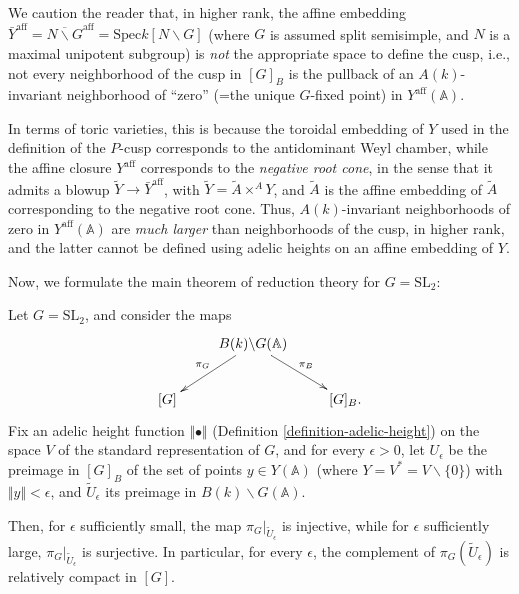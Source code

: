 \begin{remark}
 \label{remark-basic-affine}
We caution the reader that, in higher rank, the affine embedding $\bar Y^{\text{aff}}=\overline{N\backslash G}^{\text{aff}} = \text{Spec} k[N\backslash G]$ (where $G$ is assumed split semisimple, and $N$ is a maximal unipotent subgroup) is \emph{not} the appropriate space to define the cusp, i.e., not every neighborhood of the cusp in $[G]_B$ is the pullback of an $A(k)$-invariant neighborhood of ``zero'' (=the unique $G$-fixed point) in $Y^{\text{aff}}(\mathbb A)$. 

In terms of toric varieties, this is because the toroidal embedding of $Y$ used in the definition of the $P$-cusp corresponds to the antidominant Weyl chamber, while the affine closure $Y^{\text{aff}}$ corresponds to the \emph{negative root cone}, in the sense that it admits a blowup $\tilde Y \to \bar Y^{\text{aff}}$, with $\tilde Y = \tilde A\times^A Y$, and $\tilde A$ is the affine embedding of $\tilde A$ corresponding to the negative root cone. Thus, $A(k)$-invariant neighborhoods of zero in $Y^{\text{aff}}(\mathbb A)$ are \emph{much larger} than neighborhoods of the cusp, in higher rank, and the latter cannot be defined using adelic heights on an affine embedding of $Y$.
\end{remark}

Now, we formulate the main theorem of reduction theory for $G=\text{SL}_2$:

\begin{theorem}
 \label{theorem-reduction-SL2}
Let $G = \text{SL}_2$, and consider the maps 
\begin{equation}
\label{equation-leftrightSL2} 
\xymatrix{
& B(k)\backslash G(\mathbb A) \ar[dl]_{\pi_G}\ar[dr]^{\pi_B}& \\
[G] && [G]_B. 
}\end{equation}
Fix an adelic height function $\Vert \bullet \Vert$ (Definition \ref{definition-adelic-height}) on the space $V$ of the standard representation of $G$, and for every $\epsilon >0$, let $U_\epsilon$ be the preimage in $[G]_B$ of the set of points $y\in Y(\mathbb A)$ (where $Y=V^*=V\smallsetminus\{0\}$) with $\Vert y \Vert <\epsilon$, and $\tilde U_\epsilon$ its preimage in $B(k)\backslash G(\mathbb A)$.

Then, for $\epsilon$ sufficiently small, the map $\pi_G|_{\tilde U_\epsilon}$ is injective, while for $\epsilon$ sufficiently large, $\pi_G|_{\tilde U_\epsilon}$ is surjective. In particular, for every $\epsilon$, the complement of $\pi_G({\tilde U_\epsilon})$ is relatively compact in $[G]$.
\end{theorem}

